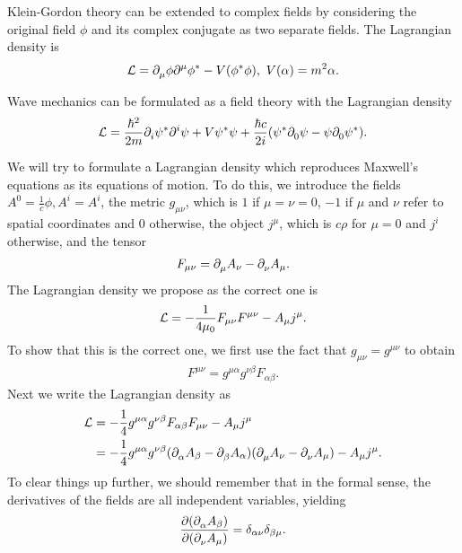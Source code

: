 Klein-Gordon theory can be extended to complex fields by considering the original field $\phi$ and its complex conjugate as two separate fields. The Lagrangian density is
\begin{align*}
	\lag = \del{\mu}{\phi}\del[\mu]{}{\cc{\phi}} - V(\cc{\phi}\phi),\ V(\alpha) = m^{2}\alpha.
\end{align*}

Wave mechanics can be formulated as a field theory with the Lagrangian density
\begin{align*}
	\lag = \frac{\hbar^{2}}{2m}\del{i}{\cc{\psi}}\del[i]{}{\psi} + V\cc{\psi}\psi + \frac{\hbar c}{2i}(\cc{\psi}\del{0}{\psi} - \psi\del{0}{\cc{\psi}}).
\end{align*}

We will try to formulate a Lagrangian density which reproduces Maxwell's equations as its equations of motion. To do this, we introduce the fields $A^{0} = \frac{1}{c}\phi, A^{i} = A^{i}$, the metric $g_{\mu\nu}$, which is $1$ if $\mu = \nu = 0$, $-1$ if $\mu$ and $\nu$ refer to spatial coordinates and $0$ otherwise, the object $j^{\mu}$, which is $c\rho$ for $\mu = 0$ and $j^{i}$ otherwise, and the tensor
\begin{align*}
	F_{\mu\nu} = \del{\mu}{A_{\nu}} - \del{\nu}{A_{\mu}}.
\end{align*}
The Lagrangian density we propose as the correct one is
\begin{align*}
	\lag = -\frac{1}{4\mu_{0}}F_{\mu\nu}F^{\mu\nu} - A_{\mu}j^{\mu}.
\end{align*}
To show that this is the correct one, we first use the fact that $g_{\mu\nu} = g^{\mu\nu}$ to obtain
\begin{align*}
	F^{\mu\nu} = g^{\mu\alpha}g^{\nu\beta}F_{\alpha\beta}.
\end{align*}
Next we write the Lagrangian density as
\begin{align*}
	\lag &= -\frac{1}{4}g^{\mu\alpha}g^{\nu\beta}F_{\alpha\beta}F_{\mu\nu} - A_{\mu}j^{\mu} \\
	     &= -\frac{1}{4}g^{\mu\alpha}g^{\nu\beta}(\del{\alpha}{A_{\beta}} - \del{\beta}{A_{\alpha}})(\del{\mu}{A_{\nu}} - \del{\nu}{A_{\mu}}) - A_{\mu}j^{\mu}.
\end{align*}
To clear things up further, we should remember that in the formal sense, the derivatives of the fields are all independent variables, yielding
\begin{align*}
	\pdv{(\del{\alpha}{A_{\beta}})}{(\del{\nu}{A_{\mu}})} = \delta_{\alpha\nu}\delta_{\beta\mu}.
\end{align*}
